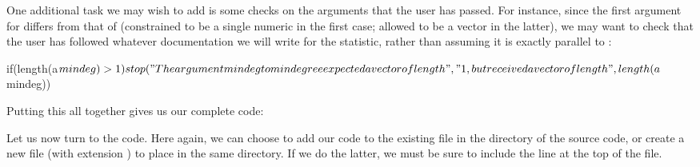 \documentclass[nojss]{jss}
\begin{document}
One additional task we may wish to add is some checks on the arguments that the
user has passed. For instance, since the first argument for 
differs from that of  (constrained to be a single numeric in the
first case; allowed to be a vector in the latter), we may want to check that the
user has followed whatever documentation we will write for the statistic, rather
than assuming it is exactly parallel to :
\begin{CodeChunk}
\begin{CodeInput}
  if(length(a$mindeg) > 1)
    stop("The argument mindeg to mindegree expected a vector of length ",
         "1, but received a vector of length ",length(a$mindeg))
\end{CodeInput}
\end{CodeChunk}

Putting this all together gives us our complete  code:
\begin{CodeChunk}
\end{CodeChunk}

Let us now turn to the  code. Here again, we can choose to add our code
to the existing file  in the  directory of the
 source code, or create a new file (with extension
) to place in the same directory. If we do the latter, we must be sure
to include the line  at the top of the file.
\end{document}
